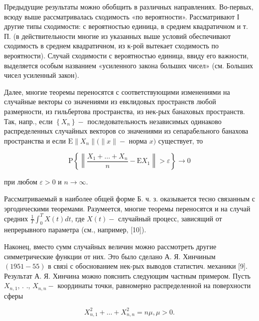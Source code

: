 \documentclass[10pt]{article}
\begin{document}
Предыдущие результаты можно обобщить в различных направлениях. Во-первых, всюду выше рассматривалась сходимость «по вероятности». Рассматривают І другие типы сходимости: с вероятностью единица, в среднем квадратичном и т. П. (в действительности многие из указанных выше условий обеспечивают сходимость в среднем квадратичном, из к-рой вытекает сходимость по вероятности). Случай сходимости с вероятностью единица, ввиду его важности, выделяется особым названием «усиленного закона больших чисел» (см. Больших чисел усиленный закон).



Далее, многие теоремы переносятся с соответствующими изменениями на случайные векторы со значениями из евклидовых пространств любой размерности, из гильбертова пространства, из нек-рых банаховых пространств. Так, напр., если $\left\{X_{n}\right\}-$ последовательность независимых одинаково распределенных случайных векторов со значениями из сепарабельного банахова пространства и если $\mathrm{E}\left\|X_{n}\right\|(\|x\|-$ норма $x)$ существует, то



\[

\mathrm{P}\left\{\left\|\frac{X_{1}+\ldots+X_{n}}{n}-\mathrm{E} X_{1}\right\|>\varepsilon\right\} \rightarrow 0

\]



при любом $\varepsilon>0$ и $n \rightarrow \infty$.



Рассматриваемый в наиболее общей форме Б. ч. з. оказывается тесно связанным с эргодическими теоремами. Разумеется, многие теоремы переносятся и на случай средних $\frac{1}{T} \int_{0}^{T} X(t) d t$, где $X(t)-$ случайный процесс, зависящий от непрерывного параметра (см., например, [10]).



Наконец, вместо сумм случайных величин можно рассмотреть другие симметрические функции от них. Это было сделано А. Я. Хинчиным $(1951-55)$ в связі с обоснованием нек-рых выводов статистич. механики [9]. Результат А. Я. Хинчина можно пояснить следующим частным примером. Пусть $X_{n, 1}$, . ., $X_{n, n}-$ координаты точки, равномерно распределенной на поверхности сферы



\[

X_{n, 1}^{2}+\ldots+X_{n, n}^{2}=n \mu, \mu>0 .

\]
\end{document}
